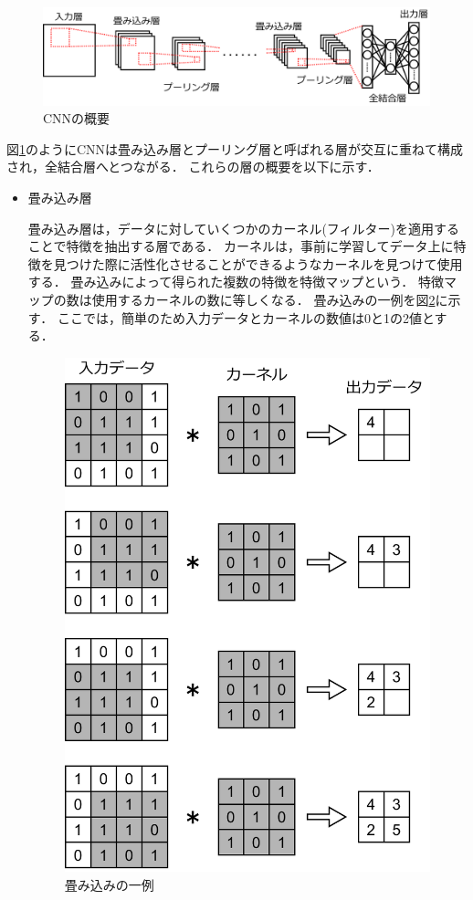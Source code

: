\documentclass{thesis}
\begin{document}
\begin{figure}[H]
	\centering
	\includegraphics[scale=0.35]{./image/CNN_sample.pdf}
	\caption{CNNの概要}
	\label{fig:CNN_sample}
\end{figure}

図\ref{fig:CNN_sample}のようにCNNは畳み込み層とプーリング層と呼ばれる層が交互に重ねて構成され，全結合層へとつながる．
これらの層の概要を以下に示す．

\begin{itemize}	
	\item 畳み込み層
	
	畳み込み層は，データに対していくつかのカーネル(フィルター)を適用することで特徴を抽出する層である．
	カーネルは，事前に学習してデータ上に特徴を見つけた際に活性化させることができるようなカーネルを見つけて使用する．
	畳み込みによって得られた複数の特徴を特徴マップという．
	特徴マップの数は使用するカーネルの数に等しくなる．
	畳み込みの一例を図\ref{fig:conv_sample}に示す．
	ここでは，簡単のため入力データとカーネルの数値は0と1の2値とする．
	\begin{figure}[H]
		\centering
		\includegraphics[scale=0.5]{./image/conv_sample.pdf}
		\caption{畳み込みの一例}
		\label{fig:conv_sample}
	\end{figure}
	

\end{itemize}
\end{document}
